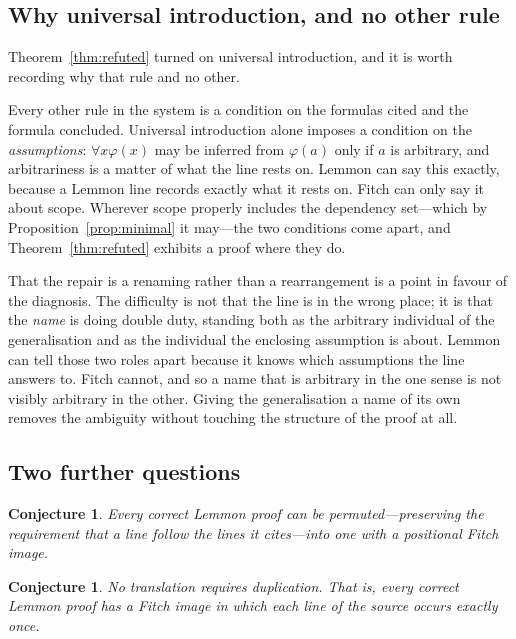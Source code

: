 \documentclass[11pt]{article}
\theoremstyle{plain}
\newtheorem{conjecture}[theorem]{Conjecture}
\theoremstyle{definition}
\theoremstyle{remark}
\begin{document}
\subsection{Why universal introduction, and no other rule}\label{sec:eigen}

Theorem~\ref{thm:refuted} turned on universal introduction, and it is worth
recording why that rule and no other.

Every other rule in the system is a condition on the formulas cited and the
formula concluded. Universal introduction alone imposes a condition on the
\emph{assumptions}: $\forall x\varphi(x)$ may be inferred from $\varphi(a)$
only if $a$ is arbitrary, and arbitrariness is a matter of what the line rests
on. Lemmon can say this exactly, because a Lemmon line records exactly what it
rests on. Fitch can only say it about scope. Wherever scope properly includes
the dependency set---which by Proposition~\ref{prop:minimal} it may---the two
conditions come apart, and Theorem~\ref{thm:refuted} exhibits a proof where
they do.

That the repair is a renaming rather than a rearrangement is a point in
favour of the diagnosis. The difficulty is not that the line is in the wrong
place; it is that the \emph{name} is doing double duty, standing both as the
arbitrary individual of the generalisation and as the individual the enclosing
assumption is about. Lemmon can tell those two roles apart because it knows
which assumptions the line answers to. Fitch cannot, and so a name that is
arbitrary in the one sense is not visibly arbitrary in the other. Giving the
generalisation a name of its own removes the ambiguity without touching the
structure of the proof at all.

\subsection{Two further questions}

\begin{conjecture}\label{conj:reorder}
Every correct Lemmon proof can be permuted---preserving the requirement that a
line follow the lines it cites---into one with a positional Fitch image.
\end{conjecture}

\begin{conjecture}\label{conj:noduplication}
No translation requires duplication. That is, every correct Lemmon proof has a
Fitch image in which each line of the source occurs exactly once.
\end{conjecture}
\end{document}
